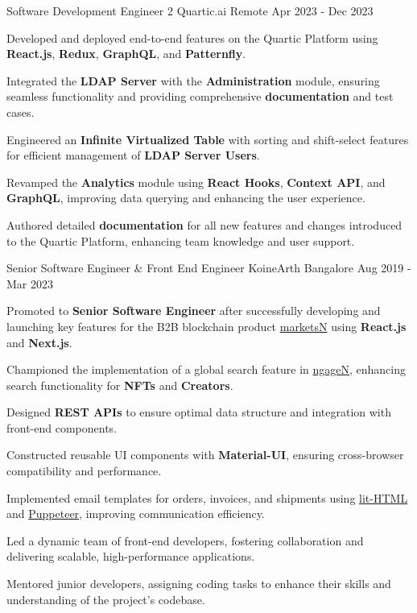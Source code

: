 \begin{cventries}
\cventry
    {Software Development Engineer 2}
    {Quartic.ai}
    {Remote}
    {Apr 2023 - Dec 2023}
    {
      \begin{cvitems}
        \item {Developed and deployed end-to-end features on the Quartic Platform using \textbf{React.js}, \textbf{Redux}, \textbf{GraphQL}, and \textbf{Patternfly}.}
        \item {Integrated the \textbf{LDAP Server} with the \textbf{Administration} module, ensuring seamless functionality and providing comprehensive \textbf{documentation} and test cases.}
        \item {Engineered an \textbf{Infinite Virtualized Table} with sorting and shift-select features for efficient management of \textbf{LDAP Server Users}.}
        \item {Revamped the \textbf{Analytics} module using \textbf{React Hooks}, \textbf{Context API}, and \textbf{GraphQL}, improving data querying and enhancing the user experience.}
        \item {Authored detailed \textbf{documentation} for all new features and changes introduced to the Quartic Platform, enhancing team knowledge and user support.}
      \end{cvitems}
    }

\cventry
    {Senior Software Engineer \& Front End Engineer}
    {KoineArth}
    {Bangalore}
    {Aug 2019 - Mar 2023}
    {
        \begin{cvitems}
            \item {Promoted to \textbf{Senior Software Engineer} after successfully developing and launching key features for the B2B blockchain product \href{https://ngagen.com/}{marketsN} using \textbf{React.js} and \textbf{Next.js}.}
            \item {Championed the implementation of a global search feature in \href{https://ngagen.com/}{ngageN}, enhancing search functionality for \textbf{NFTs} and \textbf{Creators}.}
            \item {Designed \textbf{REST APIs} to ensure optimal data structure and integration with front-end components.}
            \item {Constructed reusable UI components with \textbf{Material-UI}, ensuring cross-browser compatibility and performance.}
            \item {Implemented email templates for orders, invoices, and shipments using \href{https://lit.dev/docs/libraries/standalone-templates/}{lit-HTML} and \href{https://github.com/puppeteer/puppeteer}{Puppeteer}, improving communication efficiency.}
            \item {Led a dynamic team of front-end developers, fostering collaboration and delivering scalable, high-performance applications.}
            \item {Mentored junior developers, assigning coding tasks to enhance their skills and understanding of the project’s codebase.}
        \end{cvitems}
    }



\end{cventries}
